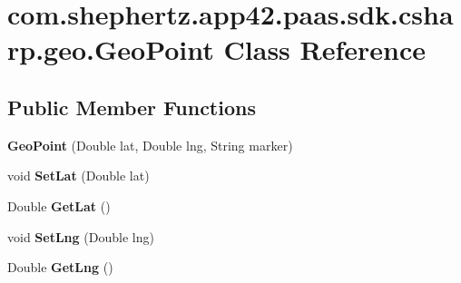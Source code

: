 \hypertarget{classcom_1_1shephertz_1_1app42_1_1paas_1_1sdk_1_1csharp_1_1geo_1_1_geo_point}{\section{com.\+shephertz.\+app42.\+paas.\+sdk.\+csharp.\+geo.\+Geo\+Point Class Reference}
\label{classcom_1_1shephertz_1_1app42_1_1paas_1_1sdk_1_1csharp_1_1geo_1_1_geo_point}
}
\subsection*{Public Member Functions}
\begin{DoxyCompactItemize}
\item 
\hypertarget{classcom_1_1shephertz_1_1app42_1_1paas_1_1sdk_1_1csharp_1_1geo_1_1_geo_point_a9db5ec8ed038a0dd4536dbd6b9591ada}{{\bfseries Geo\+Point} (Double lat, Double lng, String marker)}\label{classcom_1_1shephertz_1_1app42_1_1paas_1_1sdk_1_1csharp_1_1geo_1_1_geo_point_a9db5ec8ed038a0dd4536dbd6b9591ada}

\item 
\hypertarget{classcom_1_1shephertz_1_1app42_1_1paas_1_1sdk_1_1csharp_1_1geo_1_1_geo_point_a197962e3edc75356efec05c65c1e660e}{void {\bfseries Set\+Lat} (Double lat)}\label{classcom_1_1shephertz_1_1app42_1_1paas_1_1sdk_1_1csharp_1_1geo_1_1_geo_point_a197962e3edc75356efec05c65c1e660e}

\item 
\hypertarget{classcom_1_1shephertz_1_1app42_1_1paas_1_1sdk_1_1csharp_1_1geo_1_1_geo_point_ac3cd0c68170f3f296dbfeddb39794bd3}{Double {\bfseries Get\+Lat} ()}\label{classcom_1_1shephertz_1_1app42_1_1paas_1_1sdk_1_1csharp_1_1geo_1_1_geo_point_ac3cd0c68170f3f296dbfeddb39794bd3}

\item 
\hypertarget{classcom_1_1shephertz_1_1app42_1_1paas_1_1sdk_1_1csharp_1_1geo_1_1_geo_point_a18020170e786bc4f026f47c650152285}{void {\bfseries Set\+Lng} (Double lng)}\label{classcom_1_1shephertz_1_1app42_1_1paas_1_1sdk_1_1csharp_1_1geo_1_1_geo_point_a18020170e786bc4f026f47c650152285}

\item 
\hypertarget{classcom_1_1shephertz_1_1app42_1_1paas_1_1sdk_1_1csharp_1_1geo_1_1_geo_point_adee4ed515a619cc8ed6db165af33a01b}{Double {\bfseries Get\+Lng} ()}\label{classcom_1_1shephertz_1_1app42_1_1paas_1_1sdk_1_1csharp_1_1geo_1_1_geo_point_adee4ed515a619cc8ed6db165af33a01b}


\end{DoxyCompactItemize}
